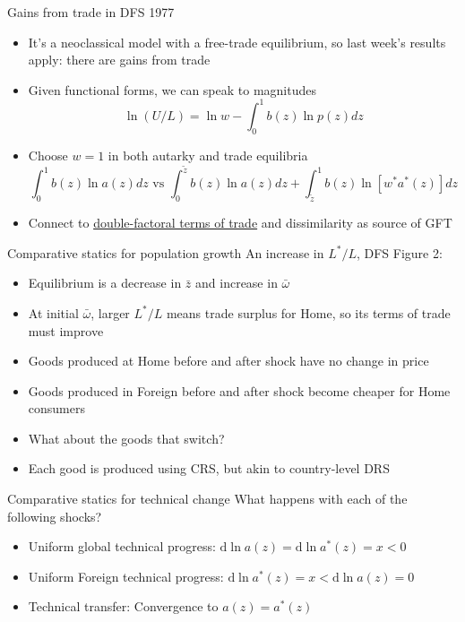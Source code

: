 \documentclass[10pt,notes=hide]{beamer}
\begin{document}
\begin{frame}{Gains from trade in DFS 1977}
\begin{itemize}
	\item It's a neoclassical model with a free-trade equilibrium,
	so last week's results apply: there are gains from trade
	\item Given functional forms, we can speak to magnitudes
	\begin{equation*}
		\ln (U/L) = {\ln w} - \int_{0}^{1} b(z) \ln p(z) dz
	\end{equation*}
	\item Choose $w=1$ in both autarky and trade equilibria
	\begin{equation*}
	 \int_{0}^{1} b(z) \ln a(z) dz \text{ vs } \int_{0}^{\tilde{z}} b(z) \ln a(z) dz + \int_{\tilde{z}}^{1} b(z) \ln \left[w^{*} a^{*}(z)\right] dz 
	\end{equation*}
	\item Connect to \href{http://www-personal.umich.edu/~alandear/glossary/d.html\#DoubleFactoralTermsOfTrade}{double-factoral terms of trade} and dissimilarity as source of GFT
\end{itemize}
\end{frame}
\begin{frame}{Comparative statics for population growth}
An increase in $L^{*}/L$, DFS Figure 2:
\begin{itemize}
	\item Equilibrium is a decrease in $\bar{z}$ and increase in $\bar{\omega}$
	\item At initial $\bar{\omega}$, larger $L^{*}/L$ means trade surplus for Home, so its terms of trade must improve
	\item Goods produced at Home before and after shock have no change in price
	\item Goods produced in Foreign before and after shock become cheaper for Home consumers
	\item What about the goods that switch?
	\item Each good is produced using CRS, but akin to country-level DRS
\end{itemize}
\end{frame}
\begin{frame}{Comparative statics for technical change}
What happens with each of the following shocks?
\begin{itemize}
	\item Uniform global technical progress:  $\textrm{d}\ln a(z) = \textrm{d}\ln a^{*}(z) = x < 0$
	\item Uniform Foreign technical progress: $\textrm{d}\ln a^{*}(z) = x < \textrm{d}\ln a(z) = 0$
	\item Technical transfer: Convergence to $a(z) = a^{*}(z)$
\end{itemize}
\end{frame}
\end{document}

